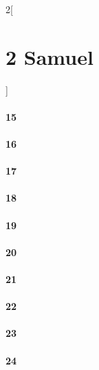 \documentclass{book}
\begin{document}
\begin{multicols}{2}[\part{2 Samuel}]
\subsection*{15}
\subsection*{16}
\subsection*{17}
\subsection*{18}
\subsection*{19}
\subsection*{20}
\subsection*{21}
\subsection*{22}
\subsection*{23}
\subsection*{24}
\end{multicols}
\end{document}

